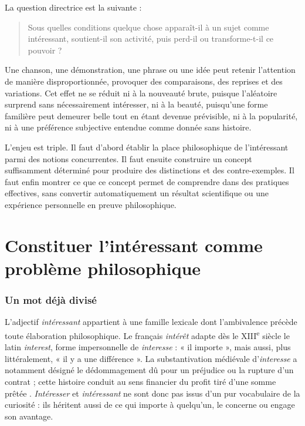 \documentclass[11pt,a4paper]{article}
\begin{document}
La question directrice est la suivante :

\begin{quote}
Sous quelles conditions quelque chose apparaît-il à un sujet comme
intéressant, soutient-il son activité, puis perd-il ou transforme-t-il ce
pouvoir ?
\end{quote}

Une chanson, une démonstration, une phrase ou une idée peut retenir l'attention
de manière disproportionnée, provoquer des comparaisons, des reprises et des
variations. Cet effet ne se réduit ni à la nouveauté brute, puisque l'aléatoire
surprend sans nécessairement intéresser, ni à la beauté, puisqu'une forme
familière peut demeurer belle tout en étant devenue prévisible, ni à la
popularité, ni à une préférence subjective entendue comme donnée sans histoire.

L'enjeu est triple. Il faut d'abord établir la place philosophique de
l'intéressant parmi des notions concurrentes. Il faut ensuite construire un
concept suffisamment déterminé pour produire des distinctions et des
contre-exemples. Il faut enfin montrer ce que ce concept permet de comprendre
dans des pratiques effectives, sans convertir automatiquement un résultat
scientifique ou une expérience personnelle en preuve philosophique.

\part{Constituer l'intéressant comme problème philosophique}

\section{Un mot déjà divisé}

L'adjectif \emph{intéressant} appartient à une famille lexicale dont
l'ambivalence précède toute élaboration philosophique. Le français
\emph{intérêt} adapte dès le XIII\textsuperscript{e} siècle le latin
\emph{interest}, forme impersonnelle de \emph{interesse} : « il importe », mais
aussi, plus littéralement, « il y a une différence ». La substantivation
médiévale d'\emph{interesse} a notamment désigné le dédommagement dû pour un
préjudice ou la rupture d'un contrat ; cette histoire conduit au sens financier
du profit tiré d'une somme prêtée
\parencite{academie2026interet,cnrtl2026interet}. \emph{Intéresser} et
\emph{intéressant} ne sont donc pas issus d'un pur vocabulaire de la curiosité :
ils héritent aussi de ce qui importe à quelqu'un, le concerne ou engage son
avantage.
\end{document}
